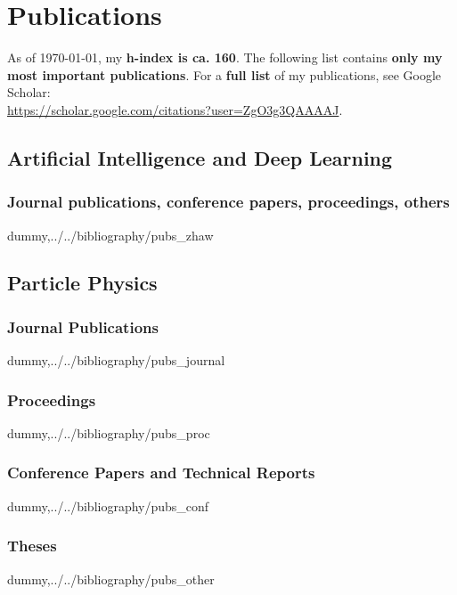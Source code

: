 \documentclass[10pt,twoside,a4paper]{report}
\begin{document}



\nocite{*}


\chapter*{Publications}

\noindent
As of \mydate \today, my {\bf h-index is ca. 160}. The following list contains {\bf only my most important publications}. For a {\bf full list} of my publications, see Google Scholar: \\
\href{https://scholar.google.com/citations?user=ZgO3g3QAAAAJ}{https://scholar.google.com/citations?user=ZgO3g3QAAAAJ}. 

\section*{Artificial Intelligence and Deep Learning}

\subsection*{Journal publications, conference papers, proceedings, others} 

\begin{btSect}{dummy,../../bibliography/pubs_zhaw}
	\btPrintNotCited
\end{btSect}

\section*{Particle Physics}

\subsection*{Journal Publications}

\begin{btSect}{dummy,../../bibliography/pubs_journal}
	\btPrintNotCited
\end{btSect}

\subsection*{Proceedings}

\begin{btSect}{dummy,../../bibliography/pubs_proc}
	\btPrintNotCited
\end{btSect}

\subsection*{Conference Papers and Technical Reports}

\begin{btSect}{dummy,../../bibliography/pubs_conf}
	\btPrintNotCited
\end{btSect}

\subsection*{Theses}

\begin{btSect}{dummy,../../bibliography/pubs_other}
	\btPrintNotCited
\end{btSect}
\end{document}
